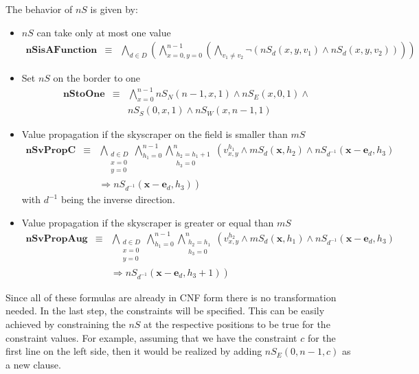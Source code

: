 \documentclass[a4paper, 12pt, titlepage]{article}
\begin{document}
The behavior of $nS$ is given by:
\begin{itemize}
	
\item $nS$ can take only at most one value
	\begin{eqnarray}
		\pmb{nSisAFunction} &\equiv& \bigwedge_{d\in D} \left( \bigwedge_{x=0,y=0}^{n-1} \left( \bigwedge_{v_1 \not = v_2} \neg \left( nS_{d}(x,y,v_1) \wedge nS_{d}(x,y,v_2) \right) \right) \right)
	\end{eqnarray}
	
\item Set $nS$ on the border to one
	\begin{eqnarray}
		\pmb{nStoOne} &\equiv& \bigwedge_{x=0}^{n-1} nS_{N}(n-1,x,1) \wedge nS_{E}(x,0,1) \wedge \nonumber \\
	&&  nS_{S}(0,x,1) \wedge nS_{W}(x,n-1,1)
	\end{eqnarray}
	
\item Value propagation if the skyscraper on the field is smaller than $mS$
	\begin{eqnarray}
		\pmb{nSvPropC} &\equiv& \bigwedge_{\substack{d\in D\\x=0\\y=0}} \bigwedge_{h_{1}=0}^{n-1} \bigwedge_{\substack{h_{2} = h_{1}+1\\h_{3}=0}}^{n} \left( v_{x,y}^{h_1} \wedge mS_d(\pmb x,h_2) \wedge nS_{d^{-1}}(\pmb x - \pmb e_d,h_3) \right. \nonumber \\
	&& \left.\Rightarrow nS_{d^{-1}}(\pmb x - \pmb e_d,h_3) \right)
	\end{eqnarray}
	with $d^{-1}$ being the inverse direction.

	\item Value propagation if the skyscraper is greater or equal than $mS$
	\begin{eqnarray}
		\pmb{nSvPropAug} &\equiv& \bigwedge_{\substack{d\in D\\x=0\\y=0}} \bigwedge_{h_{1}=0}^{n-1} \bigwedge_{\substack{h_{2} = h_{1}\\h_{3}=0}}^{n} \left( v_{x,y}^{h_2} \wedge mS_d(\pmb x,h_1) \wedge nS_{d^{-1}}(\pmb x - \pmb e_d,h_3) \right. \nonumber \\
	&& \left.\Rightarrow nS_{d^{-1}}(\pmb x - \pmb e_d,h_3+1) \right)
	\end{eqnarray}
\end{itemize}

Since all of these formulas are already in CNF form there is no transformation needed. In the last step, the constraints will be specified. This can be easily achieved by constraining the $nS$ at the respective positions to be true for the constraint values. For example, assuming that we have the constraint $c$ for the first line on the left side, then it would be realized by adding $nS_{E}(0,n-1,c)$ as a new clause.
\end{document}
